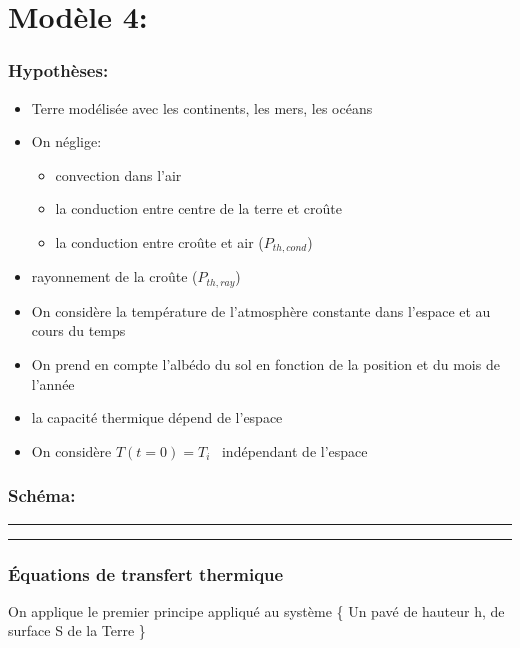 \documentclass[a4paper,12pt]{article}
\begin{document}
\section*{Modèle 4: }
\subsubsection*{Hypothèses:}
\begin{itemize}
    \item Terre modélisée avec les continents, les mers, les océans 
    \item  On néglige: 
    \begin{itemize}
        \item convection dans l'air
        \item la conduction entre centre de la terre et croûte
        \item la conduction entre croûte et air (\(P_{th,cond}\))
    \end{itemize} 
    \item  rayonnement de la croûte (\(P_{th,ray}\))
    \item On considère la température de l'atmosphère constante dans l'espace et  au cours du temps 
    \item On prend en compte l'albédo du sol en fonction de la position et du mois de l'année 
    \item la capacité thermique dépend de l'espace 
    \item On considère $T(t=0) = T_i$ \  indépendant de l'espace  
    
    
    
    
\end{itemize}

\subsubsection*{Schéma:} 
\noindent\textcolor{gray}{\rule{\linewidth}{0.4pt}}

    
\begin{center}
  
\end{center}
\noindent\textcolor{gray}{\rule{\linewidth}{0.4pt}}

\subsubsection*{Équations de transfert thermique}

On applique le premier principe appliqué au système \{ Un pavé de hauteur h, de surface S de la Terre \}
\ \ 
\[

\]
\end{document}
